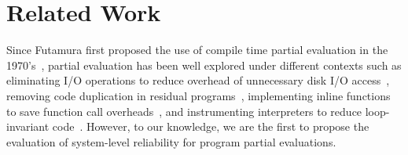 \section{Related Work}

Since Futamura first proposed the use of compile time partial evaluation in the 1970’s~\cite{Futamura}, partial evaluation has been well explored under different contexts such as eliminating I/O operations to reduce overhead of unnecessary disk I/O access~\cite{Smowton}, removing code duplication in residual programs~\cite{Debois}, implementing inline functions to save function call overheads~\cite{Jones1996}, and instrumenting interpreters to reduce loop-invariant code~\cite{Jones1993}.
However, to our knowledge, we are the first to propose the evaluation of system-level reliability for program partial evaluations.  
